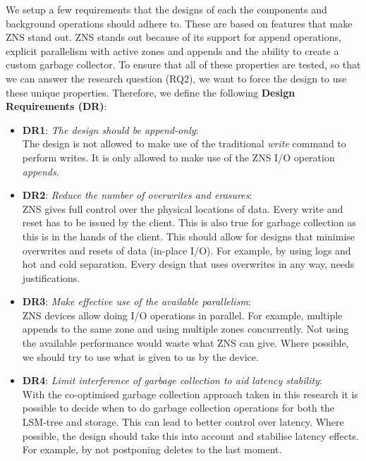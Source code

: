 We setup a few requirements that the designs of each the components and background operations should adhere to. These are based on features that make ZNS stand out. ZNS stands out because of its support for append operations, explicit parallelism with active zones and appends and the ability to create a custom garbage collector. To ensure that all of these properties are tested, so that we can answer the research question (RQ2), we want to force the design to use these unique properties. Therefore, we define the following \textbf{Design Requirements (DR)}:
\begin{itemize}
    \item \textbf{DR1}: \textit{The design should be append-only}:\\
    The design is not allowed to make use of the traditional \textit{write} command to perform writes. It is only allowed to make use of the ZNS I/O operation \textit{appends}. 
    \item \textbf{DR2}: \textit{Reduce the number of overwrites and erasures}:\\
    ZNS gives full control over the physical locations of data. Every write and reset has to be issued by the client. This is also true for garbage collection as this is in the hands of the client. This should allow for designs that minimise overwrites and resets of data (in-place I/O). For example, by using logs and hot and cold separation. Every design that uses overwrites in any way, needs justifications.
    \item \textbf{DR3}: \textit{Make effective use of the available parallelism}:\\
    ZNS devices allow doing I/O operations in parallel. For example, multiple appends to the same zone and using multiple zones concurrently. Not using the available performance would waste what ZNS can give. Where possible, we should try to use what is given to us by the device.
    \item \textbf{DR4}: \textit{Limit interference of garbage collection to aid latency stability}:\\
    With the co-optimised garbage collection approach taken in this research it is possible to decide when to do garbage collection operations for both the LSM-tree and storage. This can lead to better control over latency. Where possible, the design should take this into account and stabilise latency effects. For example, by not postponing deletes to the last moment.
\end{itemize}

